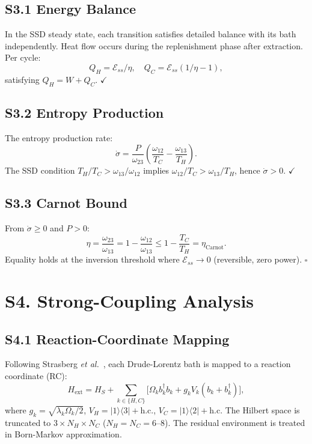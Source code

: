 \documentclass[prl,twocolumn,superscriptaddress,amsmath,amssymb]{revtex4-2}
\begin{document}
\subsection{S3.1 Energy Balance}

In the SSD steady state, each transition satisfies detailed balance with its bath independently. Heat flow occurs during the replenishment phase after extraction. Per cycle:
\begin{equation}
Q_H = \mathcal{E}_{ss}/\eta, \quad Q_C = \mathcal{E}_{ss}(1/\eta - 1),
\end{equation}
satisfying $Q_H = W + Q_C$. $\checkmark$

\subsection{S3.2 Entropy Production}

The entropy production rate:
\begin{equation}
\dot\sigma = \frac{P}{\omega_{23}}\left(\frac{\omega_{12}}{T_C} - \frac{\omega_{13}}{T_H}\right).
\end{equation}
The SSD condition $T_H/T_C > \omega_{13}/\omega_{12}$ implies $\omega_{12}/T_C > \omega_{13}/T_H$, hence $\dot\sigma > 0$. $\checkmark$

\subsection{S3.3 Carnot Bound}

From $\dot\sigma \geq 0$ and $P > 0$:
\begin{equation}
\eta = \frac{\omega_{23}}{\omega_{13}} = 1 - \frac{\omega_{12}}{\omega_{13}} \leq 1 - \frac{T_C}{T_H} = \eta_{\mathrm{Carnot}}.
\end{equation}
Equality holds at the inversion threshold where $\mathcal{E}_{ss} \to 0$ (reversible, zero power). $\square$

\section{S4. Strong-Coupling Analysis}

\subsection{S4.1 Reaction-Coordinate Mapping}

Following Strasberg \textit{et al.}~\cite{Strasberg2016}, each Drude-Lorentz bath is mapped to a reaction coordinate (RC):
\begin{equation}
H_{\mathrm{ext}} = H_S + \sum_{k\in\{H,C\}} \bigl[\Omega_k b_k^\dagger b_k + g_k V_k(b_k + b_k^\dagger)\bigr],
\end{equation}
where $g_k = \sqrt{\lambda_k\Omega_k/2}$, $V_H = |1\rangle\langle3| + \mathrm{h.c.}$, $V_C = |1\rangle\langle2| + \mathrm{h.c.}$ The Hilbert space is truncated to $3 \times N_H \times N_C$ ($N_H = N_C = 6$--8). The residual environment is treated in Born-Markov approximation.
\end{document}
